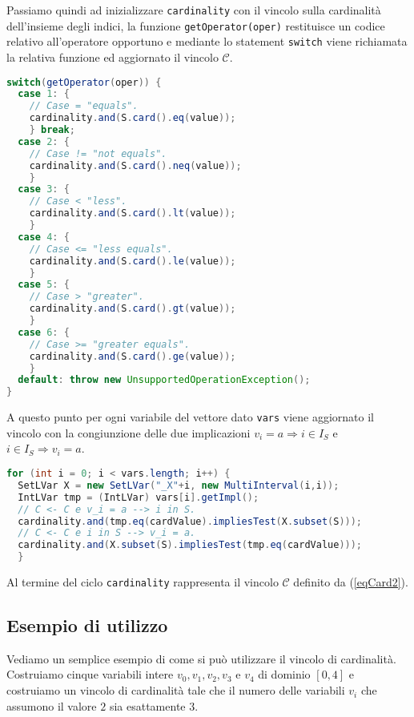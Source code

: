 Passiamo quindi ad inizializzare \texttt{cardinality}  con il vincolo sulla 
cardinalità dell'insieme degli indici, la funzione 
\texttt{getOperator(oper)}  restituisce un codice relativo all'operatore 
opportuno
e mediante lo statement
\texttt{switch}  viene richiamata la relativa funzione ed aggiornato il vincolo
$\mathcal{C}$.
\begin{lstlisting}[language=Java,
                   caption = {postCardinality()},
                   frame = single]
switch(getOperator(oper)) {
  case 1: {
    // Case = "equals". 
    cardinality.and(S.card().eq(value));
    } break;
  case 2: {
    // Case != "not equals".
    cardinality.and(S.card().neq(value));
    }
  case 3: {
    // Case < "less".
    cardinality.and(S.card().lt(value));
    } 
  case 4: {
    // Case <= "less equals".
    cardinality.and(S.card().le(value));
    } 
  case 5: {
    // Case > "greater".
    cardinality.and(S.card().gt(value));
    } 
  case 6: {
    // Case >= "greater equals".
    cardinality.and(S.card().ge(value));
    } 
  default: throw new UnsupportedOperationException();
}
\end{lstlisting}

A questo punto per ogni variabile del vettore dato \texttt{vars}  viene
aggiornato il vincolo con la congiunzione delle due implicazioni 
$v_i = a \Rightarrow i \in I_S$ e $i \in I_S \Rightarrow v_i = a$.
\begin{lstlisting}[language=Java,
                   caption = {postCardinality()},
                   frame = single]
for (int i = 0; i < vars.length; i++) {
  SetLVar X = new SetLVar("_X"+i, new MultiInterval(i,i));
  IntLVar tmp = (IntLVar) vars[i].getImpl();
  // C <- C e v_i = a --> i in S. 
  cardinality.and(tmp.eq(cardValue).impliesTest(X.subset(S)));
  // C <- C e i in S --> v_i = a.
  cardinality.and(X.subset(S).impliesTest(tmp.eq(cardValue)));
  }
\end{lstlisting}

Al termine del ciclo \texttt{cardinality}  rappresenta il vincolo
$\mathcal{C}$ definito da (\ref{eqCard2}).

\subsection*{Esempio di utilizzo}
Vediamo un semplice esempio di come si può utilizzare il vincolo di
cardinalità. Costruiamo cinque variabili intere $v_0, v_1, v_2, v_3$ e $v_4$ di 
dominio $[0, 4]$ e costruiamo un vincolo di cardinalità tale che il numero
delle variabili $v_i$ che assumono il valore $2$ sia esattamente $3$.

